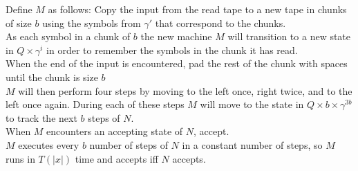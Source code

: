 \documentclass[letterpaper,notitlepage,twoside]{article}
\newcommand\tab[1][1cm]{\hspace*{#1}} %
\begin{document}
Define $M$ as follows:
\tab Copy the input from the read tape to a new tape in chunks of size $b$ using the symbols from $\gamma'$ that correspond to the chunks. \\
\tab As each symbol in a chunk of $b$ the new machine $M$ will transition to a new state in $Q \times \gamma^{i}$ in order to remember the symbols in the chunk it has read. \\
\tab When the end of the input is encountered, pad the rest of the chunk with spaces until the chunk is size $b$ \\
\tab $M$ will then perform four steps by moving to the left once, right twice, and to the left once again. During each of these steps $M$ will move to the state in $Q \times b \times \gamma^{3b}$ to track the next $b$ steps of $N$. \\
\tab When $M$ encounters an accepting state of $N$, accept. \\
$M$ executes every $b$ number of steps of $N$ in a constant number of steps, so $M$ runs in $T(|x|)$ time and accepts iff $N$ accepts.
\end{document}
